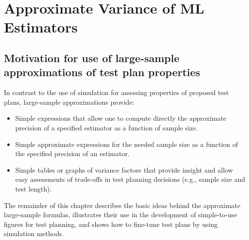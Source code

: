 \section{Approximate Variance of ML Estimators}
\label{section:planning.asymptotic.variance}
\subsection{Motivation for use of large-sample approximations of test
plan properties}
In contrast to the use of simulation for assessing properties
of proposed test plans, large-sample approximations provide:
\begin{itemize}
\item
Simple expressions that allow one to compute directly the
approximate precision of a specified estimator as a function of
sample size.
\item
Simple approximate expressions for the needed sample size
as a function of the specified precision of an estimator.
\item
Simple tables or graphs of variance factors that provide insight and allow
easy assessments of trade-offs in test planning decisions
(e.g., sample size and test length).
\end{itemize}
The remainder of this chapter describes the basic ideas behind the 
approximate large-sample formulas, illustrates their use in the 
development of simple-to-use figures for test planning, and shows how to
fine-tune test plans by using simulation methods.

